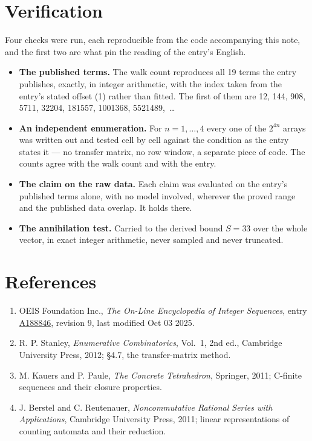 \documentclass[11pt]{article}
\theoremstyle{definition}
\begin{document}
\section{Verification}

Four checks were run, each reproducible from the code accompanying this note, and the first two are what pin the reading of the entry's English.

\begin{itemize}

\item {\bfseries The published terms.} The walk count reproduces all 19 terms the entry publishes, exactly, in integer arithmetic, with the index taken from the entry's stated offset (1) rather than fitted. The first of them are 12, 144, 908, 5711, 32204, 181557, 1001368, 5521489,~\dots

\item {\bfseries An independent enumeration.} For $n = 1,\dots,4$ every one of the $2^{4n}$ arrays was written out and tested cell by cell against the condition as the entry states it --- no transfer matrix, no row window, a separate piece of code. The counts agree with the walk count and with the entry.

\item {\bfseries The claim on the raw data.} Each claim was evaluated on the entry's published terms alone, with no model involved, wherever the proved range and the published data overlap. It holds there.

\item {\bfseries The annihilation test.} Carried to the derived bound $S = 33$ over the whole vector, in exact integer arithmetic, never sampled and never truncated.

\end{itemize}

\section{References}

\begin{enumerate}

\item OEIS Foundation Inc., \emph{The On-Line Encyclopedia of Integer Sequences}, entry \href{https://oeis.org/A188846}{A188846}, revision 9, last modified Oct 03 2025.

\item R. P. Stanley, \emph{Enumerative Combinatorics}, Vol.~1, 2nd ed., Cambridge University Press, 2012; \S4.7, the transfer-matrix method.

\item M. Kauers and P. Paule, \emph{The Concrete Tetrahedron}, Springer, 2011; C-finite sequences and their closure properties.

\item J. Berstel and C. Reutenauer, \emph{Noncommutative Rational Series with Applications}, Cambridge University Press, 2011; linear representations of counting automata and their reduction.

\end{enumerate}
\end{document}
